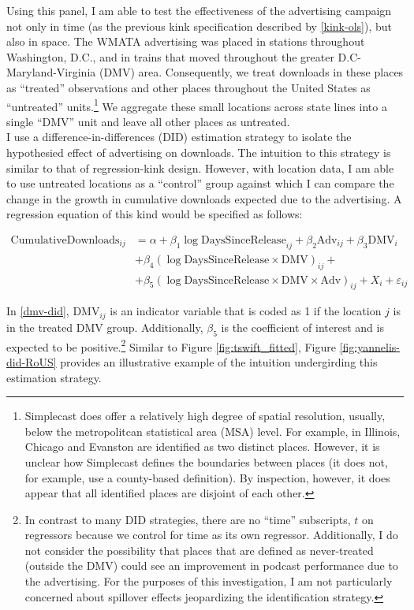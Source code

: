 \documentclass[11pt, letterpaper, twoside]{article}
\begin{document}
Using this panel, I am able to test the effectiveness of the advertising campaign not only in time (as the previous kink specification described by \eqref{kink-ols}), but also in space. The WMATA advertising was placed in stations throughout Washington, D.C., and in trains that moved throughout the greater D.C-Maryland-Virginia (DMV) area. Consequently, we treat downloads in these places as ``treated'' observations and other places throughout the United States as ``untreated'' units.\footnote{Simplecast does offer a relatively high degree of spatial resolution, usually, below the metropolitcan statistical area (MSA) level. For example, in Illinois, Chicago and Evanston are identified as two distinct places. However, it is unclear how Simplecast defines the boundaries between places (it does not, for example, use a county-based definition). By inspection, however, it does appear that all identified places are disjoint of each other.} We aggregate these small locations across state lines into a single ``DMV'' unit and leave all other places as untreated.\\

I use a difference-in-differences (DID) estimation strategy to isolate the hypothesied effect of advertising on downloads. The intuition to this strategy is similar to that of regression-kink design. However, with location data, I am able to use untreated locations as a ``control'' group against which I can compare the change in the growth in cumulative downloads expected due to the advertising. A regression equation of this kind would be specified as follows:

\begin{align}
  \label{dmv-did}
  \text{CumulativeDownloads}_{ij} &= \alpha + \beta_1 \log \text{DaysSinceRelease}_{ij} + \beta_2 \text{Adv}_{ij} + \beta_3 \text{DMV}_i \\ \nonumber
    &+ \beta_4(\log \text{DaysSinceRelease} \times \text{DMV})_{ij} + \\ \nonumber
    &+ \beta_5(\log \text{DaysSinceRelease} \times \text{DMV} \times \text{Adv})_{ij} + X_i + \varepsilon_{ij} 
\end{align}

In \eqref{dmv-did}, $\text{DMV}_{ij}$ is an indicator variable that is coded as 1 if the location $j$ is in the treated DMV group. Additionally, $\beta_5$ is the coefficient of interest and is expected to be positive.\footnote{In contrast to many DID strategies, there are no ``time'' subscripts, $t$ on regressors because we control for time as its own regressor. Additionally, I do not consider the possibility that places that are defined as never-treated (outside the DMV) could see an improvement in podcast performance due to the advertising. For the purposes of this investigation, I am not particularly concerned about spillover effects jeopardizing the identification strategy.} Similar to Figure \ref{fig:tswift_fitted}, Figure \ref{fig:yannelis-did-RoUS} provides an illustrative example of the intuition undergirding this estimation strategy.\\
\end{document}
